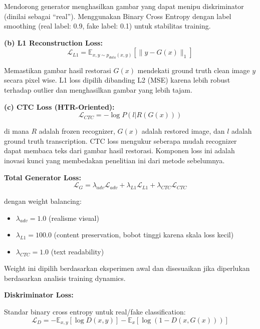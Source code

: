 \documentclass[12pt,a4paper]{article}
\begin{document}
Mendorong generator menghasilkan gambar yang dapat menipu diskriminator (dinilai sebagai ``real''). Menggunakan Binary Cross Entropy dengan label smoothing (real label: 0.9, fake label: 0.1) untuk stabilitas training.

\textbf{(b) L1 Reconstruction Loss:}
\begin{equation}
\mathcal{L}_{L1} = \mathbb{E}_{x, y \sim p_{data}(x,y)}[\|y - G(x)\|_1]
\end{equation}

Memastikan gambar hasil restorasi $G(x)$ mendekati ground truth clean image $y$ secara pixel wise. L1 loss dipilih dibanding L2 (MSE) karena lebih robust terhadap outlier dan menghasilkan gambar yang lebih tajam.

\textbf{(c) CTC Loss (HTR-Oriented):}
\begin{equation}
\mathcal{L}_{CTC} = - \log P(l | R(G(x)))
\end{equation}

di mana $R$ adalah frozen recognizer, $G(x)$ adalah restored image, dan $l$ adalah ground truth transcription. CTC loss mengukur seberapa mudah recognizer dapat membaca teks dari gambar hasil restorasi. Komponen loss ini adalah inovasi kunci yang membedakan penelitian ini dari metode sebelumnya.

\textbf{Total Generator Loss:}
\begin{equation}
\mathcal{L}_G = \lambda_{adv} \mathcal{L}_{adv} + \lambda_{L1} \mathcal{L}_{L1} + \lambda_{CTC} \mathcal{L}_{CTC}
\end{equation}

dengan weight balancing:
\begin{itemize}[leftmargin=*, nosep]
\item $\lambda_{adv} = 1.0$ (realisme visual)
\item $\lambda_{L1} = 100.0$ (content preservation, bobot tinggi karena skala loss kecil)
\item $\lambda_{CTC} = 1.0$ (text readability)
\end{itemize}

Weight ini dipilih berdasarkan eksperimen awal dan disesuaikan jika diperlukan berdasarkan analisis training dynamics.

\textbf{Diskriminator Loss:}

Standar binary cross entropy untuk real/fake classification:
\begin{equation}
\mathcal{L}_D = - \mathbb{E}_{x,y}[\log D(x,y)] - \mathbb{E}_{x}[\log(1 - D(x, G(x)))]
\end{equation}
\end{document}

